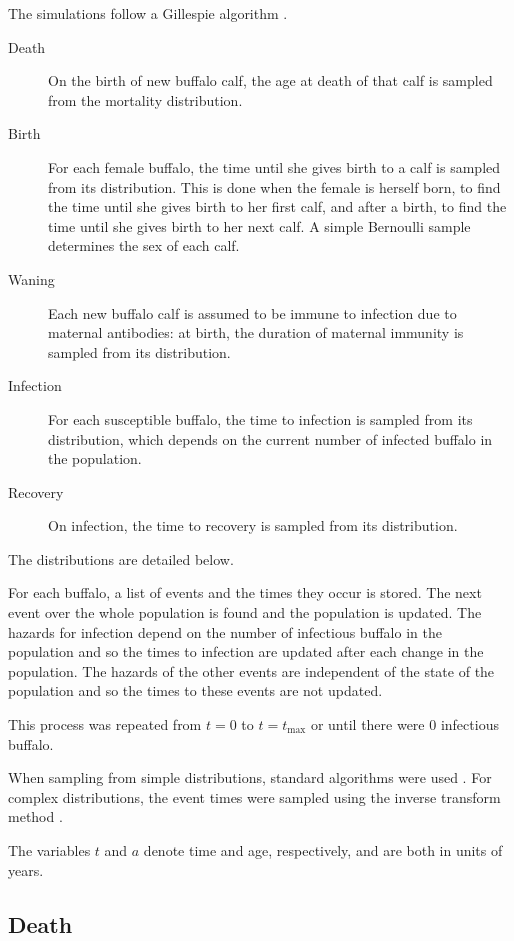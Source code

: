 \documentclass{article}
\begin{document}
The simulations follow a Gillespie algorithm \citep{gillespie_1977}.
\begin{description}
\item[Death] On the birth of new buffalo calf, the age at death of
  that calf is sampled from the mortality distribution.

\item[Birth] For each female buffalo, the time until she gives birth
  to a calf is sampled from its distribution.  This is done when the
  female is herself born, to find the time until she gives birth to
  her first calf, and after a birth, to find the time until she gives
  birth to her next calf.  A simple Bernoulli sample determines the
  sex of each calf.

\item[Waning] Each new buffalo calf is assumed to be immune to
  infection due to maternal antibodies: at birth, the duration of
  maternal immunity is sampled from its distribution.

\item[Infection] For each susceptible buffalo, the time to infection
  is sampled from its distribution, which depends on the current
  number of infected buffalo in the population.

\item[Recovery] On infection, the time to recovery is sampled from its
  distribution.
\end{description}
The distributions are detailed below.

For each buffalo, a list of events and the times they occur is stored.
The next event over the whole population is found and the population
is updated.  The hazards for infection depend on the number of
infectious buffalo in the population and so the times to infection are
updated after each change in the population.  The hazards of the other
events are independent of the state of the population and so the times
to these events are not updated.

This process was repeated from $t = 0$ to $t = t_{\text{max}}$ or
until there were $0$ infectious buffalo.

When sampling from simple distributions, standard algorithms were used
\citep{scipy}.  For complex distributions, the event times were
sampled using the inverse transform method \citep{rubinstein_1981}.

The variables $t$ and $a$ denote time and age, respectively, and are
both in units of years.

\subsection{Death}
\end{document}
